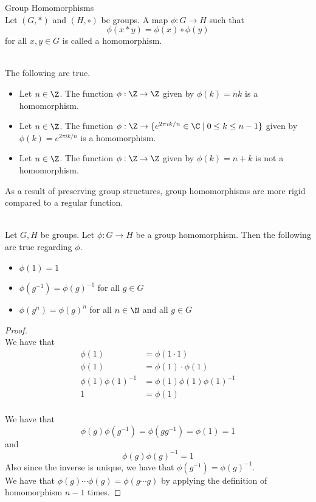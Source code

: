 \documentclass[a4paper]{article}
\begin{document}
\begin{defn}{Group Homomorphisms}{}\\
Let $(G,*)$ and $(H,\circ)$ be groups. A map $\phi:G\to H$ such that $$\phi(x*y)=\phi(x)\circ\phi(y)$$ for all $x,y\in G$ is called a homomorphism. 
\end{defn}

\begin{eg}{}{}\\
The following are true. 
\begin{itemize}
\item Let $n\in\Z$. The function $\phi:\Z\to\Z$ given by $\phi(k)=nk$ is a homomorphism. 
\item Let $n\in\Z$. The function $\phi:\Z\to\{e^{2\pi ik/n}\in\C\;|\;0\leq k\leq n-1\}$ given by $\phi(k)=e^{2\pi i k/n}$ is a homomorphism. 

\item Let $n\in\Z$. The function $\phi:\Z\to\Z$ given by $\phi(k)=n+k$ is not a homomorphism. 
\end{itemize}
\end{eg}

As a result of preserving group structures, group homomorphisms are more rigid compared to a regular function. 

\begin{lmm}{}{}\\
Let $G,H$ be groups. Let $\phi:G\to H$ be a group homomorphism. Then the following are true regarding $\phi$. 
\begin{itemize}
\item $\phi(1)=1$
\item $\phi(g^{-1})=\phi(g)^{-1}$ for all $g\in G$
\item $\phi(g^n)=\phi(g)^n$ for all $n\in\N$ and all $g\in G$
\end{itemize}
\begin{proof}\\
We have that 
\begin{align*}
\phi(1)&=\phi(1\cdot 1)\\
\phi(1)&=\phi(1)\cdot\phi(1)\\
\phi(1)\phi(1)^{-1}&=\phi(1)\phi(1)\phi(1)^{-1}\\
1&=\phi(1)
\end{align*}~\\

We have that $$\phi(g)\phi(g^{-1})=\phi(gg^{-1})=\phi(1)=1$$ and $$\phi(g)\phi(g)^{-1}=1$$ Also since the inverse is unique, we have that $\phi(g^{-1})=\phi(g)^{-1}$. \\

We have that $\phi(g)\cdots\phi(g)=\phi(g\cdots g)$ by applying the definition of homomorphism $n-1$ times. 
\end{proof}
\end{lmm}
\end{document}
